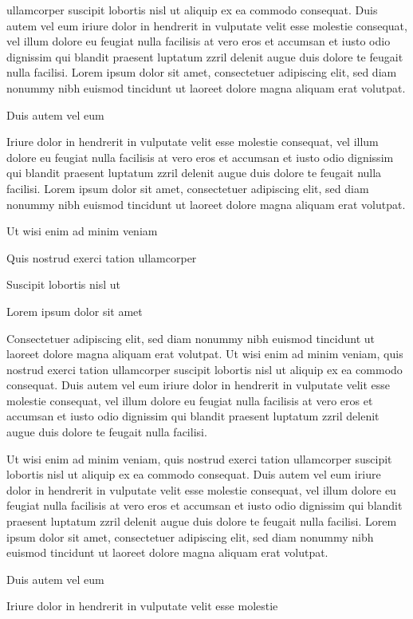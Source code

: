 \documentclass[11pt,twoside]{article}\makeatletter
\begin{document}
      ullamcorper suscipit lobortis nisl ut aliquip ex ea commodo
      consequat. Duis autem vel eum iriure dolor in hendrerit in vulputate
      velit esse molestie consequat, vel illum dolore eu feugiat nulla
      facilisis at vero eros et accumsan et iusto odio dignissim qui blandit
      praesent luptatum zzril delenit augue duis dolore te feugait nulla
      facilisi. Lorem ipsum dolor sit amet, consectetuer adipiscing elit,
      sed diam nonummy nibh euismod tincidunt ut laoreet dolore magna
      aliquam erat volutpat. \par Duis autem vel eum \par Iriure dolor in hendrerit in vulputate velit esse molestie
      consequat, vel illum dolore eu feugiat nulla facilisis at vero eros et
      accumsan et iusto odio dignissim qui blandit praesent luptatum zzril
      delenit augue duis dolore te feugait nulla facilisi. Lorem ipsum dolor
      sit amet, consectetuer adipiscing elit, sed diam nonummy nibh euismod
      tincidunt ut laoreet dolore magna aliquam erat volutpat. \par Ut wisi enim ad minim veniam\par Quis nostrud exerci tation ullamcorper \par Suscipit lobortis nisl ut \par Lorem ipsum dolor sit amet\par Consectetuer adipiscing elit, sed diam nonummy nibh euismod
      tincidunt ut laoreet dolore magna aliquam erat volutpat. Ut wisi enim
      ad minim veniam, quis nostrud exerci tation ullamcorper suscipit
      lobortis nisl ut aliquip ex ea commodo consequat. Duis autem vel eum
      iriure dolor in hendrerit in vulputate velit esse molestie consequat,
      vel illum dolore eu feugiat nulla facilisis at vero eros et accumsan
      et iusto odio dignissim qui blandit praesent luptatum zzril delenit
      augue duis dolore te feugait nulla facilisi.\par Ut wisi enim ad minim veniam, quis nostrud exerci tation
      ullamcorper suscipit lobortis nisl ut aliquip ex ea commodo
      consequat. Duis autem vel eum iriure dolor in hendrerit in vulputate
      velit esse molestie consequat, vel illum dolore eu feugiat nulla
      facilisis at vero eros et accumsan et iusto odio dignissim qui blandit
      praesent luptatum zzril delenit augue duis dolore te feugait nulla
      facilisi. Lorem ipsum dolor sit amet, consectetuer adipiscing elit,
      sed diam nonummy nibh euismod tincidunt ut laoreet dolore magna
      aliquam erat volutpat. \par Duis autem vel eum \par Iriure dolor in hendrerit in vulputate velit esse molestie
\end{document}
